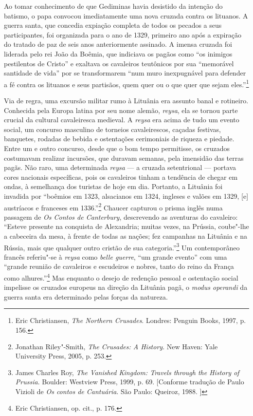Ao tomar conhecimento de que Gediminas havia desistido da intenção do
batismo, o papa convocou imediatamente uma nova cruzada contra os
lituanos. A guerra santa, que concedia expiação completa de todos os
pecados a seus participantes, foi organizada para o ano de 1329,
primeiro ano após a expiração do tratado de paz de seis anos
anteriormente assinado. A imensa cruzada foi liderada pelo rei João da
Boêmia, que indiciava os pagãos como ``os inimigos pestilentos de
Cristo'' e exaltava os cavaleiros teutônicos por sua ``memorável
santidade de vida'' por se transformarem ``num muro inexpugnável para
defender a fé contra os lituanos e seus partisãos, quem quer ou o que
quer que sejam eles.''\footnote{Eric Christiansen, \textit{The Northern Crusades}. Londres: Penguin Books, 1997, p. 156.}
%

Via de regra, uma excursão militar rumo à Lituânia era assunto banal e
rotineiro. Conhecida pela Europa latina por seu nome alemão,
\textit{reysa}, ela se tornou parte crucial da cultural cavaleiresca
medieval. A \textit{reysa} era acima de tudo um evento social, um concurso
masculino de torneios cavaleirescos, caçadas festivas, banquetes,
rodadas de bebida e ostentações cerimoniais de riqueza e piedade. Entre
um e outro concurso, desde que o bom tempo permitisse, os cruzados
costumavam realizar incursões, que duravam semanas, pela imensidão das
terras pagãs. Não raro, uma determinada \textit{reysa} --- a cruzada
setentrional --- portava cores nacionais específicas, pois os cavaleiros
tinham a tendência de chegar em ondas, à semelhança dos turistas de hoje
em dia. Portanto, a Lituânia foi invadida por ``boêmios em 1323,
alsacianos em 1324, ingleses e valões em 1329, {[}e{]} austríacos e
franceses em 1336.''\footnote{Jonathan Riley"-Smith, \textit{The Crusades: A History}. New Haven: Yale University Press, 2005, p. 253.} Chaucer capturou o prisma inglês numa passagem de \textit{Os Contos de
Canterbury}, descrevendo as aventuras do cavaleiro: ``Esteve presente na
conquista de Alexandria; muitas vezes, na Prússia, coube"-lhe a cabeceira
da mesa, à frente de todas as nações; fez campanhas na Lituânia e na
Rússia, mais que qualquer outro cristão de sua categoria.''\footnote{James Charles Roy, \textit{The Vanished Kingdom: Travels through the History of Prussia}. Boulder: Westview Press, 1999, p. 69. [Conforme tradução de Paulo Vizioli de \textit{Os contos de Cantuária}. São Paulo:  Queiroz, 1988. ]} Um contemporâneo francês referiu"-se à \textit{reysa} como \textit{belle guerre}, ``um grande evento''
com uma ``grande reunião de cavaleiros e escudeiros e nobres, tanto do
reino da França como alhures.''\footnote{Eric Christiansen, op. cit., p. 176.} Mas enquanto o desejo de redenção pessoal e ostentação social impelisse os cruzados europeus na direção da
Lituânia pagã, o \textit{modus operandi} da guerra santa era determinado
pelas forças da natureza.

